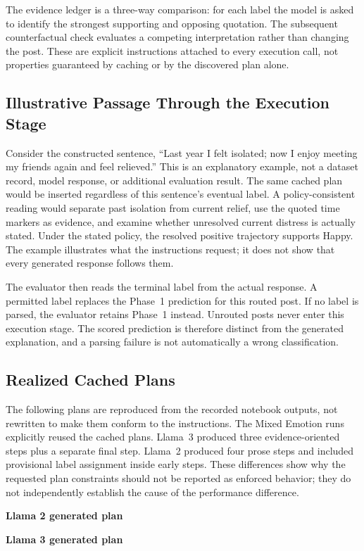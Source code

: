 \documentclass{ieeeaccess}
\begin{document}
The evidence ledger is a three-way comparison: for each label the model is asked to identify the strongest supporting and opposing quotation. The subsequent counterfactual check evaluates a competing interpretation rather than changing the post. These are explicit instructions attached to every execution call, not properties guaranteed by caching or by the discovered plan alone.



\subsection{Illustrative Passage Through the Execution Stage}
Consider the constructed sentence, ``Last year I felt isolated; now I enjoy meeting my friends again and feel relieved.'' This is an explanatory example, not a dataset record, model response, or additional evaluation result. The same cached plan would be inserted regardless of this sentence's eventual label. A policy-consistent reading would separate past isolation from current relief, use the quoted time markers as evidence, and examine whether unresolved current distress is actually stated. Under the stated policy, the resolved positive trajectory supports Happy. The example illustrates what the instructions request; it does not show that every generated response follows them.

The evaluator then reads the terminal label from the actual response. A permitted label replaces the Phase~1 prediction for this routed post. If no label is parsed, the evaluator retains Phase~1 instead. Unrouted posts never enter this execution stage. The scored prediction is therefore distinct from the generated explanation, and a parsing failure is not automatically a wrong classification.

\subsection{Realized Cached Plans}
The following plans are reproduced from the recorded notebook outputs, not rewritten to make them conform to the instructions. The Mixed Emotion runs explicitly reused the cached plans. Llama~3 produced three evidence-oriented steps plus a separate final step. Llama~2 produced four prose steps and included provisional label assignment inside early steps. These differences show why the requested plan constraints should not be reported as enforced behavior; they do not independently establish the cause of the performance difference.
\par\medskip\noindent\begin{minipage}{\textwidth}
\textbf{Llama 2 generated plan}

\end{minipage}\par\medskip
\par\medskip\noindent\begin{minipage}{\textwidth}
\textbf{Llama 3 generated plan}

\end{minipage}\par\medskip
\end{document}
